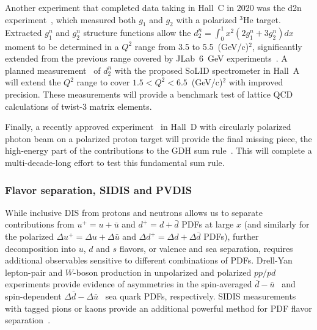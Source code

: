 Another experiment that completed data taking in Hall~C in 2020 was the d2n experiment~\cite{d2n12GeV}, which measured both $g_1$ and $g_2$ with a polarized $^3$He target. 
Extracted $g_1^n$ and $g_2^n$ structure functions allow the
    $d_2^n = \int_0^1 x^2 (2 g_1^n + 3 g_2^n)dx$ 
moment to be determined in a $Q^2$ range from 3.5 to 5.5~(GeV/c)$^2$, significantly extended from the previous range covered by JLab~6~GeV experiments~\cite{Posik:2014usi, Armstrong:2018xgk}.
%
A planned measurement~\cite{SoLIDd2n} of $d_2^n$ with the proposed SoLID spectrometer in Hall~A will extend the $Q^2$ range to cover $1.5 < Q^2 < 6.5$~(GeV/c)$^2$ with improved precision.
These measurements will provide a benchmark test of lattice QCD calculations of twist-3 matrix elements. 

\iffalse
\begin{figure}[ht]
\begin{center}
\texttt{[image: Figures/d2.pdf]}
\caption{{\color{blue} [UPDATE?]} Comparison of proton (red) and neutron (blue) $d_2$ matrix element extractions from JLab experiments and lattice QCD with the JAM15 global QCD analysis~\cite{Sato:2016tuz}.}
\label{f.d2n}
\end{center}
\end{figure}
\fi

Finally, a recently approved experiment~\cite{dalton2020measurement} in Hall~D with circularly polarized photon beam on a polarized proton target will provide the final missing piece, the high-energy part of the contributions to the GDH sum rule~\cite{Gerasimov:1965et,Drell:1966jv,HY}. 
This will complete a multi-decade-long effort to test this fundamental sum rule.

\subsubsection*{Flavor separation, SIDIS and PVDIS}
While inclusive DIS from protons and neutrons allows us to separate contributions from $u^+ = u + \bar u$ and $d^+ = d + \bar d$ PDFs at large $x$ (and similarly for the polarized $\Delta u^+ = \Delta u + \Delta \bar u$ and $\Delta d^+ = \Delta d + \Delta \bar d$ PDFs), further decomposition into $u$, $d$ and $s$ flavors, or valence and sea separation, requires additional observables sensitive to different combinations of PDFs.
Drell-Yan lepton-pair and $W$-boson production in unpolarized and polarized $pp/pd$ experiments provide evidence of asymmetries in the spin-averaged $\bar d - \bar u$~\cite{Dove:2021ejl} and spin-dependent $\Delta\bar d - \Delta\bar u$~\cite{Adam:2018bam} sea quark PDFs, respectively.
SIDIS measurements with tagged pions or kaons provide an additional powerful method for PDF flavor separation~\cite{Sato:2019yez, Ethier:2017zbq}.

